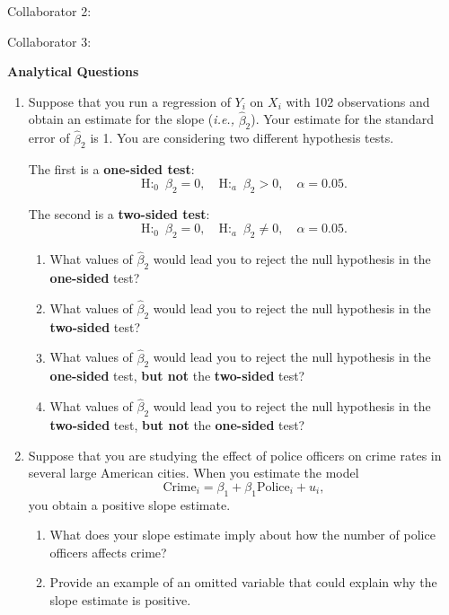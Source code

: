 \documentclass[11pt]{article}
\begin{document}
\begin{onehalfspacing}
Collaborator 2: \\
	
\vspace{0.1in}

Collaborator 3: 		
			

\newpage


\begin{center}
\textbf{Analytical Questions} \bigskip
\end{center}

\begin{enumerate}
	
\item Suppose that you run a regression of $Y_i$ on $X_i$ with 102 observations and obtain an estimate for the slope (\textit{i.e.,} $\hat{\beta}_2$). Your estimate for the standard error of $\hat{\beta}_2$ is 1. You are considering two different hypothesis tests. 

The first is a \textbf{one-sided test}:
$$\text{H:}_0 \enspace \beta_2 = 0, \quad \text{H:}_a \enspace \beta_2 > 0, \quad \alpha = 0.05.$$

The second is a \textbf{two-sided test}:
$$\text{H:}_0 \enspace \beta_2 = 0, \quad \text{H:}_a \enspace \beta_2 \neq 0, \quad \alpha = 0.05.$$

\begin{enumerate}
	\item What values of $\hat{\beta}_2$ would lead you to reject the null hypothesis in the \textbf{one-sided} test?
	\item What values of $\hat{\beta}_2$ would lead you to reject the null hypothesis in the \textbf{two-sided} test?
	\item What values of $\hat{\beta}_2$ would lead you to reject the null hypothesis in the \textbf{one-sided} test, \textbf{but not} the \textbf{two-sided} test?
	\item What values of $\hat{\beta}_2$ would lead you to reject the null hypothesis in the \textbf{two-sided} test, \textbf{but not} the \textbf{one-sided} test?
\end{enumerate}


\item Suppose that you are studying the effect of police officers on crime rates in several large American cities. When you estimate the model
$$\text{Crime}_i = \beta_1 + \beta_1 \text{Police}_i + u_i,$$
you obtain a positive slope estimate.

\begin{enumerate}
	\item What does your slope estimate imply about how the number of police officers affects crime?
	\item Provide an example of an omitted variable that could explain why the slope estimate is positive. 
\end{enumerate}



\end{enumerate}
\end{onehalfspacing}
\end{document}
